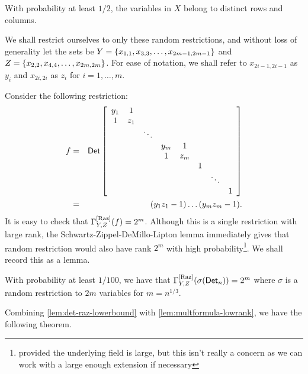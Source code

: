 \begin{claim}
With probability at least $1/2$, the variables in $X$ belong to distinct rows and columns. 
\end{claim}

We shall restrict ourselves to only these random restrictions, and without loss of generality let the sets be $Y = \left\{x_{1,1},x_{3,3},\dots,x_{2m-1,2m-1}\right\}$ and $Z = \left\{x_{2,2},x_{4,4},\dots, x_{2m,2m}\right\}$. 
For ease of notation, we shall refer to $x_{2i-1,2i-1}$ as $y_i$ and $x_{2i,2i}$ as $z_i$ for $i = 1,\dots, m$. 

Consider the following restriction:
\begin{eqnarray*}
f & = & \operatorname{\mathsf{Det}} \left[ \begin{array}{cccccccc}
y_1 & 1   &        &     &     &  &        &   \\
1   & z_1 &        &     &     &  &        &   \\
    &     & \ddots &     &     &  &        &   \\
    &     &        & y_m &1    &  &        &   \\
    &     &        & 1   &z_m  &  &        &   \\
    &     &        &     &     & 1&        &   \\
    &     &        &     &     &  & \ddots &   \\
    &     &        &     &     &  &        & 1
  \end{array}\right]\\
 &= & (y_1z_1 - 1)\dots (y_mz_m - 1).
\end{eqnarray*}
It is easy to check that $\Gamma^{\mathrm{[Raz]}}_{Y,Z}(f) = 2^m$. 
Although this is a single restriction with large rank, the Schwartz-Zippel-DeMillo-Lipton lemma immediately gives that random restriction would also have rank $2^m$ with high probability\footnote{provided the underlying field is large, but this isn't really a concern as we can work with a large enough extension if necessary}. 
We shall record this as a lemma. 

\begin{lemma}\label{lem:det-raz-lowerbound}
With probability at least $1/100$, we have that $\Gamma^{\mathrm{[Raz]}}_{Y,Z}(\sigma(\operatorname{\mathsf{Det}}_n)) = 2^m$ where $\sigma$ is a random restriction to $2m$ variables for $m = n^{1/3}$. 
\end{lemma}


Combining \autoref{lem:det-raz-lowerbound} with \autoref{lem:multformula-lowrank}, we have the following theorem. 

